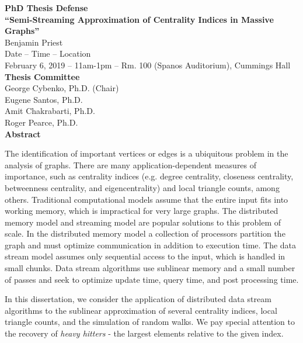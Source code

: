 \documentclass{report}
\begin{document}
\begin{center}
{\LARGE \textbf{PhD Thesis Defense}} \\
\vspace{1em}
\textbf{``Semi-Streaming Approximation of Centrality Indices in Massive Graphs''} \\
\vspace{1em}
Benjamin Priest \\
\vspace{1em}
Date -- Time -- Location\\
February 6, 2019 -- 11am-1pm -- Rm. 100 (Spanos Auditorium), Cummings Hall \\
\vspace{1em}
\textbf{Thesis Committee} \\
George Cybenko, Ph.D. (Chair) \\
Eugene Santos, Ph.D. \\
Amit Chakrabarti, Ph.D. \\
Roger Pearce, Ph.D. \\
\vspace{2em}
{\LARGE \textbf{Abstract}} \\
\end{center}

The identification of important vertices or edges is a ubiquitous problem in the analysis of graphs.
There are many application-dependent measures of importance, such as centrality indices (e.g. degree centrality, closeness centrality, betweenness centrality, and eigencentrality) and local triangle counts, among others.
Traditional computational models assume that the entire input fits into working memory, which is impractical for very large graphs.
The distributed memory model and streaming model are popular solutions to this problem of scale.
In the distributed memory model a collection of processors partition the graph and must optimize communication in addition to execution time.
The data stream model assumes only sequential access to the input, which is handled in small chunks.
Data stream algorithms use sublinear memory and a small number of passes and seek to optimize update time, query time, and post processing time.  

In this dissertation, we consider the application of distributed data stream algorithms to the sublinear approximation of several centrality indices, local triangle counts, and the simulation of random walks. 
We pay special attention to the recovery of \emph{heavy hitters} - the largest elements relative to the given index.
\end{document}
